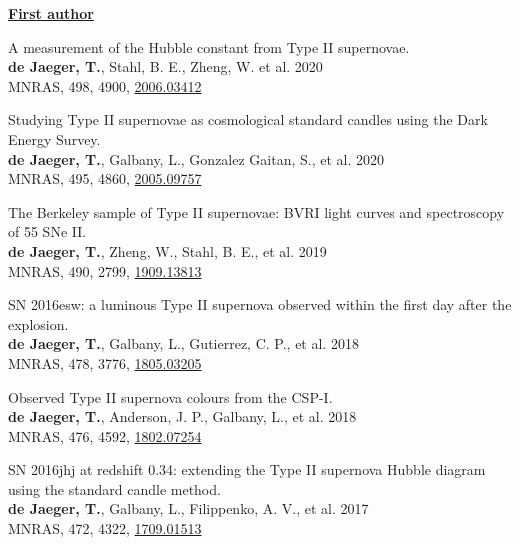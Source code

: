 \documentclass[12pt]{article}
\begin{document}
\vspace{1.4cm}
\underline{\textbf{First author}}
\vspace{0.2cm}
\begin{bibenum}

    \item 
A measurement of the Hubble constant from Type II supernovae.\\
\textbf{de Jaeger, T.}, Stahl, B. E., Zheng, W. et al. 2020\\
MNRAS, 498, 4900, \href{https://arxiv.org/pdf/2006.03412.pdf}{2006.03412}


    \item 
Studying Type II supernovae as cosmological standard candles using the Dark Energy Survey.\\
\textbf{de Jaeger, T.}, Galbany, L., Gonzalez Gaitan, S., et al. 2020\\
MNRAS, 495, 4860, \href{https://arxiv.org/pdf/2005.09757.pdf}{2005.09757}


    \item 
The Berkeley sample of Type II supernovae: BVRI light curves and spectroscopy of 55 SNe II.\\
\textbf{de Jaeger, T.}, Zheng, W., Stahl, B. E., et al. 2019\\
MNRAS, 490, 2799, \href{https://arxiv.org/pdf/1909.13813.pdf}{1909.13813}

    \item 
SN 2016esw: a luminous Type II supernova observed within the first day after the explosion.\\
\textbf{de Jaeger, T.}, Galbany, L., Gutierrez, C. P., et al. 2018\\
MNRAS, 478, 3776, \href{https://arxiv.org/abs/1805.03205}{1805.03205}

    \item 
Observed Type II supernova colours from the CSP-I.\\
\textbf{de Jaeger, T.}, Anderson, J. P., Galbany, L., et al. 2018\\
MNRAS, 476, 4592, \href{https://arxiv.org/abs/1802.07254}{1802.07254}

    \item 
SN 2016jhj at redshift 0.34: extending the Type II supernova Hubble diagram using the standard candle method.\\
\textbf{de Jaeger, T.}, Galbany, L., Filippenko, A. V., et al. 2017\\
MNRAS, 472, 4322, \href{https://arxiv.org/abs/1709.01513}{1709.01513}


\end{bibenum}
\end{document}
